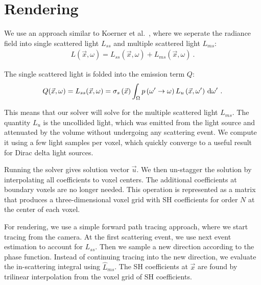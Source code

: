 \section{Rendering}
\label{sec:rendering}

We use an approach similar to Koerner et al.~\cite{Koerner14}, where we seperate the radiance field into single scattered light $L_{ss}$ and multiple scattered light $L_{ms}$:
\begin{align}
L\left(\vec{x},\omega\right) = L_{ss}\left(\vec{x},\omega\right) + L_{ms}\left(\vec{x},\omega\right)
\ .
\end{align}

The single scattered light is folded into the emission term $Q$:
\begin{align}
Q(\vec{x}, \omega) = L_{ss}(\vec{x}, \omega) = \sigma_s\left(\vec{x}\right)\int_\Omega{ p\left(\omega'\rightarrow\omega\right) L_{u}\left(\vec{x}, \omega'\right)\,\mathrm{d}\omega' }
\ .
\end{align}

This means that our solver will solve for the multiple scattered light $L_{ms}$. The quantity $L_u$ is the uncollided light, which was emitted from the light source and attenuated by the volume without undergoing any scattering event.
We compute it using a few light samples per voxel, which quickly converge to a useful result for Dirac delta light sources.

Running the solver gives solution vector $\vec{u}$. We then un-stagger the solution by interpolating all coefficients to voxel centers. The additional coefficients at boundary voxels are no longer needed. This operation is represented as a matrix that produces a three-dimensional voxel grid with SH coefficients for order $N$ at the center of each voxel.

For rendering, we use a simple forward path tracing approach, where we start tracing from the camera. At the first scattering event, we use next event estimation to account for $L_{ss}$. Then we sample a new direction according to the phase function. Instead of continuing tracing into the new direction, we evaluate the in-scattering integral using $\widehat{L}_{ms}$. The SH coefficients at $\vec{x}$ are found by trilinear interpolation from the voxel grid of SH coefficients.


